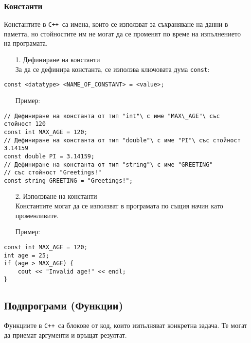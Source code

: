 \documentclass[oneside]{book}
\newcommand*{\code}[1]{\texttt{#1}}
\newcommand*{\cpp}{\texttt{C++}\ }
\begin{document}
\subsubsection{Константи}
Константите в \cpp са имена, които се използват за съхраняване на данни в паметта, но стойностите им не могат да се променят по време на изпълнението на програмата.

\begin{enumerate}\item[1.] Дефиниране на константи\\За да се дефинира константа, се използва ключовата дума \code{const}:\end{enumerate}
\begin{mdframed}\begin{lstlisting}
const <datatype> <NAME_OF_CONSTANT> = <value>;
\end{lstlisting}\end{mdframed}
\begin{itemize}\item[Пример:]\end{itemize} 
\begin{mdframed}\begin{lstlisting}
// Дефиниране на константа от тип "int"\ с име "MAX\_AGE"\ със стойност 120
const int MAX_AGE = 120;
// Дефиниране на константа от тип "double"\ с име "PI"\ със стойност 3.14159
const double PI = 3.14159;
// Дефиниране на константа от тип "string"\ с име "GREETING"
// със стойност "Greetings!"
const string GREETING = "Greetings!";
\end{lstlisting}\end{mdframed}
\begin{enumerate}\item[2.] Използване на константи\\Константите могат да се използват в програмата по същия начин като променливите.\end{enumerate}
\begin{itemize}\item[Пример:]\end{itemize}
\begin{mdframed}\begin{lstlisting}
const int MAX_AGE = 120;
int age = 25;
if (age > MAX_AGE) {
    cout << "Invalid age!" << endl;
}
\end{lstlisting}\end{mdframed}

\subsection{Подпрограми (Функции)}
Функциите в \cpp са блокове от код, които изпълняват конкретна задача. Те могат да приемат аргументи и връщат резултат.
\end{document}
